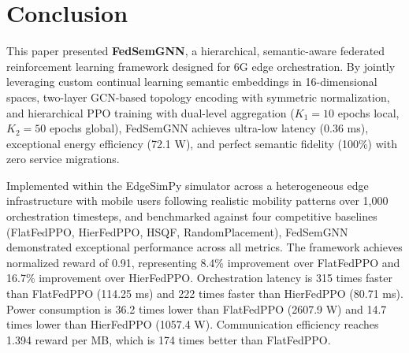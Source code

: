 \section{Conclusion}
\label{sec:conclusion}

This paper presented \textbf{FedSemGNN}, a hierarchical, semantic-aware federated reinforcement learning framework designed for 6G edge orchestration. By jointly leveraging custom continual learning semantic embeddings in 16-dimensional spaces, two-layer GCN-based topology encoding with symmetric normalization, and hierarchical PPO training with dual-level aggregation ($K_1 = 10$ epochs local, $K_2 = 50$ epochs global), FedSemGNN achieves ultra-low latency (0.36 ms), exceptional energy efficiency (72.1 W), and perfect semantic fidelity (100\%) with zero service migrations.

Implemented within the EdgeSimPy simulator across a heterogeneous edge infrastructure with mobile users following realistic mobility patterns over 1,000 orchestration timesteps, and benchmarked against four competitive baselines (FlatFedPPO, HierFedPPO, HSQF, RandomPlacement), FedSemGNN demonstrated exceptional performance across all metrics. The framework achieves normalized reward of 0.91, representing 8.4\% improvement over FlatFedPPO and 16.7\% improvement over HierFedPPO. Orchestration latency is 315 times faster than FlatFedPPO (114.25 ms) and 222 times faster than HierFedPPO (80.71 ms). Power consumption is 36.2 times lower than FlatFedPPO (2607.9 W) and 14.7 times lower than HierFedPPO (1057.4 W). Communication efficiency reaches 1.394 reward per MB, which is 174 times better than FlatFedPPO.

